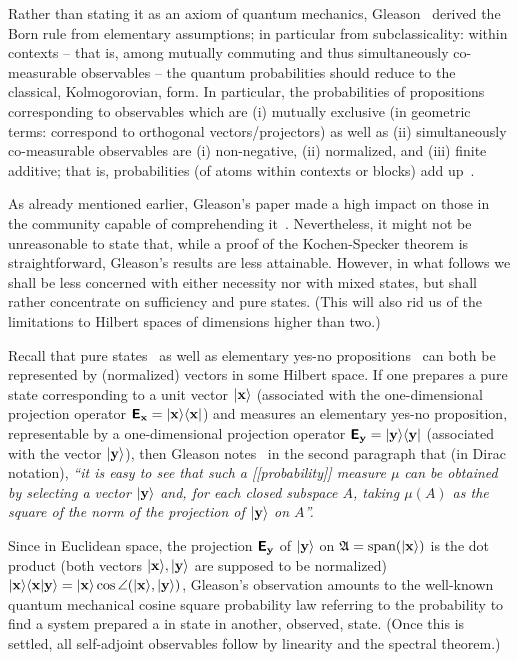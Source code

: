 Rather than stating it as an axiom of quantum mechanics,
Gleason~\cite{Gleason}
derived the Born rule from elementary assumptions; in particular from subclassicality: within contexts -- that is,
among mutually commuting and thus simultaneously co-measurable observables -- the
quantum probabilities should reduce to the classical, Kolmogorovian, form.
In particular, the probabilities of propositions corresponding to observables which are (i) mutually exclusive
(in geometric terms: correspond to orthogonal vectors/projectors)
as well as (ii) simultaneously co-measurable observables
are (i) non-negative, (ii) normalized, and (iii) finite additive; that is, probabilities
(of atoms within contexts or blocks)
add up~\cite[Section~1]{sep-probability-interpret}.

As already mentioned earlier, Gleason's paper made a high impact on those in the community capable
of comprehending it~\cite{ZirlSchl-65,kamber65,bell-66,kochen1,c-k-m,r:dvur-93,pitowsky:218,rich-bridge}.
Nevertheless, it might not be unreasonable to state that, while a proof of the Kochen-Specker theorem is straightforward,
Gleason's results are less attainable.
However, in what follows we shall be less concerned with either necessity nor with mixed states,
but shall rather concentrate on sufficiency and pure states.
(This will also rid us of the limitations to Hilbert spaces of dimensions higher than two.)

Recall that pure states~\cite{Dirac621,dirac}
as well as elementary yes-no propositions~\cite{v-neumann-49,v-neumann-55,birkhoff-36} can both
be represented by (normalized) vectors in some Hilbert space.
If one prepares a pure state corresponding to a unit vector
$\vert {\bf x} \rangle$ (associated with the one-dimensional projection operator
$\textsf{\textbf{E}}_{\bf x}=\vert {\bf x} \rangle \langle {\bf x} \vert $)
and measures an elementary yes-no proposition, representable by a one-dimensional projection operator
$\textsf{\textbf{E}}_{\bf y}=\vert {\bf y} \rangle \langle {\bf y} \vert $
(associated with the vector
$\vert {\bf y} \rangle$),
then Gleason notes~\cite[p.~885]{Gleason} in the second paragraph that (in Dirac notation),
{\em  ``it is easy to see that such a [[probability]] measure $\mu$
can be obtained by selecting a vector $\vert {\bf y} \rangle$
and, for each closed subspace $A$, taking $\mu ({A})$ as the square of the norm of the
projection %
of $\vert {\bf y} \rangle$  on ${A}$''.}

Since in Euclidean space, the
projection $\textsf{\textbf{E}}_{\bf y}$
of $\vert {\bf y} \rangle$  on $\mathfrak{A} = \text{span} (\vert {\bf x} \rangle)$
is the dot product  (both vectors $\vert {\bf x} \rangle , \vert {\bf y} \rangle$
are supposed to be normalized)
$
\vert {\bf x} \rangle  \langle {\bf x} \vert {\bf y} \rangle  =
\vert {\bf x} \rangle  \cos \angle (\vert {\bf x} \rangle , \vert {\bf y} \rangle )
$,
Gleason's observation amounts to the well-known quantum mechanical cosine square probability law
referring to the probability to find a system prepared a in state in another, observed, state.
(Once this is settled, all self-adjoint observables follow by linearity and the spectral theorem.)

